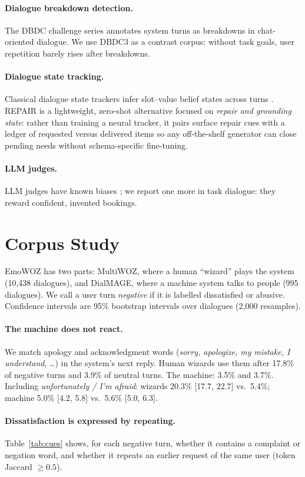 \documentclass[11pt]{article}
\begin{document}
\paragraph{Dialogue breakdown detection.} The DBDC challenge series \citep{higashinaka2016dbdc} annotates
system turns as breakdowns in chat-oriented dialogue. We use DBDC3 as a contrast corpus: without task goals,
user repetition barely rises after breakdowns.
\paragraph{Dialogue state tracking.} Classical dialogue state trackers infer slot--value belief states across
turns \citep{budzianowski2018multiwoz}. REPAIR is a lightweight, zero-shot alternative focused on \emph{repair
and grounding state}: rather than training a neural tracker, it pairs surface repair cues with a ledger of
requested versus delivered items so any off-the-shelf generator can close pending needs without schema-specific
fine-tuning.
\paragraph{LLM judges.} LLM judges have known biases \citep{zheng2023judging}; we report one more in task
dialogue: they reward confident, invented bookings.

\section{Corpus Study}
\label{sec:corpus}
EmoWOZ has two parts: MultiWOZ, where a human ``wizard'' plays the system (10,438 dialogues), and DialMAGE,
where a machine system talks to people (995 dialogues). We call a user turn \emph{negative} if it is labelled
dissatisfied or abusive. Confidence intervals are 95\% bootstrap intervals over dialogues (2,000 resamples).

\paragraph{The machine does not react.} We match apology and acknowledgment words (\emph{sorry, apologize,
my mistake, I understand}, \ldots) in the system's next reply. Human wizards use them after 17.8\% of negative
turns and 3.9\% of neutral turns. The machine: 3.5\% and 3.7\%. Including \emph{unfortunately / I'm afraid}:
wizards 20.3\% [17.7, 22.7] vs.\ 5.4\%; machine 5.0\% [4.2, 5.8] vs.\ 5.6\% [5.0, 6.3].

\paragraph{Dissatisfaction is expressed by repeating.} Table~\ref{tab:cues} shows, for each negative turn,
whether it contains a complaint or negation word, and whether it repeats an earlier request of the same user
(token Jaccard $\ge 0.5$).
\end{document}
